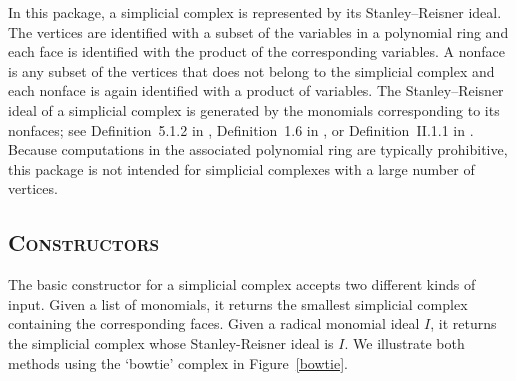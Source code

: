 \documentclass[12pt,leqno]{amsart}
\theoremstyle{definition}
\begin{document}
In this package, a simplicial complex is represented by its Stanley--Reisner
ideal. The vertices are identified with a subset of the variables in a
polynomial ring and each face is identified with the product of the
corresponding variables.  A nonface is any subset of the vertices that does
not belong to the simplicial complex and each nonface is again identified with
a product of variables. The Stanley--Reisner ideal of a simplicial complex is
generated by the monomials corresponding to its nonfaces; see Definition~5.1.2
in \cite{BH}, Definition~1.6 in \cite{MS}, or Definition~II.1.1 in
\cite{Stanley}. Because computations in the associated polynomial ring are
typically prohibitive, this package is not intended for simplicial complexes
with a large number of vertices.

\subsection*{\scshape\mdseries Constructors}

The basic constructor for a simplicial complex accepts two different kinds of
input.  Given a list of monomials, it returns the smallest simplicial complex
containing the corresponding faces.  Given a radical monomial ideal $I$, it
returns the simplicial complex whose Stanley-Reisner ideal is $I$.
We illustrate both methods using the `bowtie' complex in
Figure~\ref{bowtie}.
\end{document}
